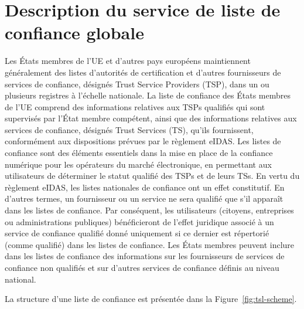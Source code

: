 \documentclass{tnreport}
\begin{document}
\section{Description du service de liste de confiance globale}
\label{sec:description}

Les États membres de l'UE et d'autres pays européens maintiennent généralement des listes d'autorités de certification et d'autres fournisseurs de services de confiance, désignés Trust Service Providers (TSP), dans un ou plusieurs registres à l'échelle nationale.
La liste de confiance des États membres de l'UE comprend des informations relatives aux TSPs qualifiés qui sont supervisés par l'État membre compétent, ainsi que des informations relatives aux services de confiance, désignés Trust Services (TS), qu'ils fournissent, conformément aux dispositions prévues par le règlement eIDAS.
Les listes de confiance sont des éléments essentiels dans la mise en place de la confiance numérique pour les opérateurs du marché électronique, en permettant aux utilisateurs de déterminer le statut qualifié des TSPs et de leurs TSs. En vertu du règlement eIDAS, les listes nationales de confiance ont un effet constitutif.
En d'autres termes, un fournisseur ou un service ne sera qualifié que s'il apparaît dans les listes de confiance. Par conséquent, les utilisateurs (citoyens, entreprises ou administrations publiques) bénéficieront de l'effet juridique associé à un service de confiance qualifié donné uniquement si ce dernier est répertorié (comme qualifié) dans les listes de confiance.	
Les États membres peuvent inclure dans les listes de confiance des informations sur les fournisseurs de services de confiance non qualifiés et sur d'autres services de confiance définis au niveau national.

La structure d'une liste de confiance est présentée dans la Figure~\ref{fig:tsl-scheme}.
\end{document}
